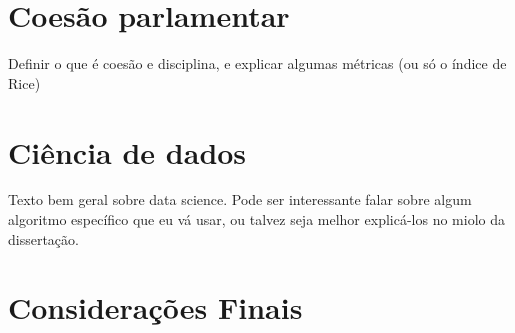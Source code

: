 \section{Coesão parlamentar}

Definir o que é coesão e disciplina, e explicar algumas métricas (ou só o índice de Rice)


\section{Ciência de dados}

Texto bem geral sobre data science. Pode ser interessante falar sobre algum algoritmo específico que eu vá usar, ou talvez seja melhor explicá-los no miolo da dissertação.

\section{Considerações Finais}





